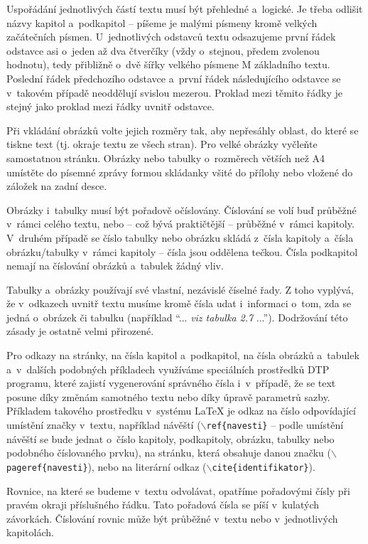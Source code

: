 \documentclass[english,cover]{fitthesis} %
\begin{document}
Uspořádání jednotlivých částí textu musí být přehledné a~logické. Je třeba odlišit názvy kapitol a~podkapitol -- píšeme je malými písmeny kromě velkých začátečních písmen. U~jednotlivých odstavců textu odsazujeme první řádek odstavce asi o~jeden až dva čtverčíky (vždy o~stejnou, předem zvolenou hodnotu), tedy přibližně o~dvě šířky velkého písmene M základního textu. Poslední řádek předchozího odstavce a~první řádek následujícího odstavce se v~takovém případě neoddělují svislou mezerou. Proklad mezi těmito řádky je stejný jako proklad mezi řádky uvnitř odstavce.

Při vkládání obrázků volte jejich rozměry tak, aby nepřesáhly oblast, do které se tiskne text (tj. okraje textu ze všech stran). Pro velké obrázky vyčleňte samostatnou stránku. Obrázky nebo tabulky o~rozměrech větších než A4 umístěte do písemné zprávy formou skládanky všité do přílohy nebo vložené do záložek na zadní desce.

Obrázky i~tabulky musí být pořadově očíslovány. Číslování se volí buď průběžné v~rámci celého textu, nebo -- což bývá praktičtější -- průběžné v~rámci kapitoly. V~druhém případě se číslo tabulky nebo obrázku skládá z~čísla kapitoly a~čísla obrázku/tabulky v~rámci kapitoly -- čísla jsou oddělena tečkou. Čísla podkapitol nemají na číslování obrázků a~tabulek žádný vliv.

Tabulky a~obrázky používají své vlastní, nezávislé číselné řady. Z toho vyplývá, že v~odkazech uvnitř textu musíme kromě čísla udat i~informaci o~tom, zda se jedná o~obrázek či tabulku (například ``... {\it viz tabulka 2.7} ...''). Dodržování této zásady je ostatně velmi přirozené.

Pro odkazy na stránky, na čísla kapitol a~podkapitol, na čísla obrázků a~tabulek a~v~dalších podobných příkladech využíváme speciálních prostředků DTP programu, které zajistí vygenerování správného čísla i~v~případě, že se text posune díky změnám samotného textu nebo díky úpravě parametrů sazby. Příkladem takového prostředku v~systému LaTeX je odkaz na číslo odpovídající umístění značky v~textu, například návěští ($\backslash${\tt ref\{navesti\}} -- podle umístění návěští se bude jednat o~číslo kapitoly, podkapitoly, obrázku, tabulky nebo podobného číslovaného prvku), na stránku, která obsahuje danou značku ($\backslash${\tt pageref\{navesti\}}), nebo na literární odkaz ($\backslash${\tt cite\{identifikator\}}).

Rovnice, na které se budeme v~textu odvolávat, opatříme pořadovými čísly při pravém okraji příslušného řádku. Tato pořadová čísla se píší v~kulatých závorkách. Číslování rovnic může být průběžné v~textu nebo v~jednotlivých kapitolách.
\end{document}
